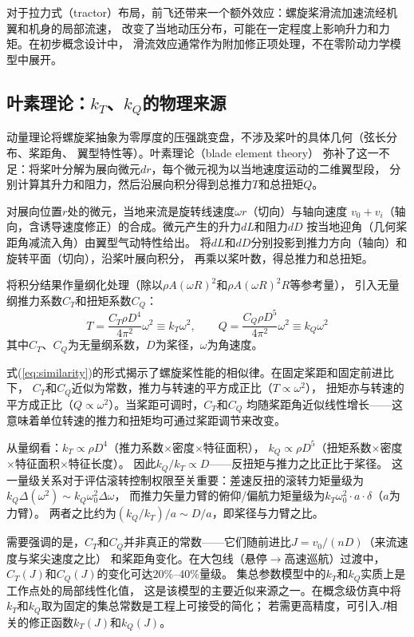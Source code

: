 \documentclass[a4paper,12pt]{ctexart}
\theoremstyle{plain}
\theoremstyle{definition}
\begin{document}
对于拉力式（tractor）布局，前飞还带来一个额外效应：螺旋桨滑流加速流经机翼和机身的局部流速，
改变了当地动压分布，可能在一定程度上影响升力和力矩。在初步概念设计中，
滑流效应通常作为附加修正项处理，不在零阶动力学模型中展开。

\subsection{叶素理论：$k_T$、$k_Q$的物理来源}

动量理论将螺旋桨抽象为零厚度的压强跳变盘，不涉及桨叶的具体几何（弦长分布、桨距角、
翼型特性等）。叶素理论（blade element theory）\cite{mccormick1995aerodynamics}
弥补了这一不足：将桨叶分解为展向微元$dr$，每个微元视为以当地速度运动的二维翼型段，
分别计算其升力和阻力，然后沿展向积分得到总推力$T$和总扭矩$Q$。

对展向位置$r$处的微元，当地来流是旋转线速度$\omega r$（切向）与轴向速度
$v_0+v_i$（轴向，含诱导速度修正）的合成。微元产生的升力$dL$和阻力$dD$
按当地迎角（几何桨距角减流入角）由翼型气动特性给出。
将$dL$和$dD$分别投影到推力方向（轴向）和旋转平面（切向），沿桨叶展向积分，
再乘以桨叶数，得总推力和总扭矩。

将积分结果作量纲化处理（除以$\rho A (\omega R)^2$和$\rho A (\omega R)^2 R$等参考量），
引入无量纲推力系数$C_T$和扭矩系数$C_Q$：
\begin{equation}
    T = \frac{C_T \rho D^4}{4\pi^2} \omega^2 \equiv k_T \omega^2, \qquad
    Q = \frac{C_Q \rho D^5}{4\pi^2} \omega^2 \equiv k_Q \omega^2
    \label{eq:similarity}
\end{equation}
其中$C_T$、$C_Q$为无量纲系数，$D$为桨径，$\omega$为角速度。

式(\ref{eq:similarity})的形式揭示了螺旋桨性能的相似律。在固定桨距和固定前进比下，
$C_T$和$C_Q$近似为常数，推力与转速的平方成正比（$T \propto \omega^2$），
扭矩亦与转速的平方成正比（$Q \propto \omega^2$）。当桨距可调时，$C_T$和$C_Q$
均随桨距角近似线性增长——这意味着单位转速的推力和扭矩均可通过桨距调节来改变。

从量纲看：$k_T \propto \rho D^4$（推力系数$\times$密度$\times$特征面积），
$k_Q \propto \rho D^5$（扭矩系数$\times$密度$\times$特征面积$\times$特征长度）。
因此$k_Q / k_T \propto D$——反扭矩与推力之比正比于桨径。
这一量级关系对于评估滚转控制权限至关重要：差速反扭的滚转力矩量级为$k_Q \Delta(\omega^2) \sim k_Q \omega_0^2 \Delta\omega$，
而推力矢量力臂的俯仰/偏航力矩量级为$k_T \omega_0^2 \cdot a \cdot \delta$（$a$为力臂）。
两者之比约为$(k_Q / k_T) / a \sim D / a$，即桨径与力臂之比。

需要强调的是，$C_T$和$C_Q$并非真正的常数——它们随前进比$J = v_0/(nD)$（来流速度与桨尖速度之比）
和桨距角变化。在大包线（悬停$\to$高速巡航）过渡中，$C_T(J)$和$C_Q(J)$的变化可达$20\%$--$40\%$量级。
集总参数模型中的$k_T$和$k_Q$实质上是工作点处的局部线性化值，
这是该模型的主要近似来源之一。在概念级仿真中将$k_T$和$k_Q$取为固定的集总常数是工程上可接受的简化；
若需更高精度，可引入$J$相关的修正函数$k_T(J)$和$k_Q(J)$。
\end{document}
